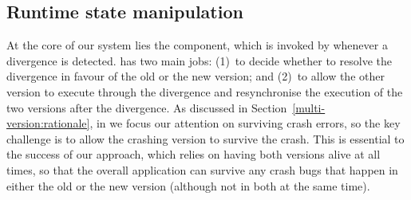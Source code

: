 
\subsection{Runtime state manipulation}
\label{sec:rem}

At the core of our system lies the \rem component, which is invoked
by \mxm whenever a divergence is detected.  \rem has two main jobs:
(1)~to decide whether to resolve the divergence in favour of the old or
the new version; and (2)~to allow the other version to execute through
the divergence and resynchronise the execution of the two versions
after the divergence.
As discussed in Section~\ref{multi-version:rationale}, in \mx we focus
our attention on surviving crash errors, so the key challenge is to
allow the crashing version to survive the crash.  This is essential to
the success of our approach, which relies on having both versions alive
at all times, so that the overall application can survive any crash bugs that
happen in either the old or the new version (although not in both at the same
time).

